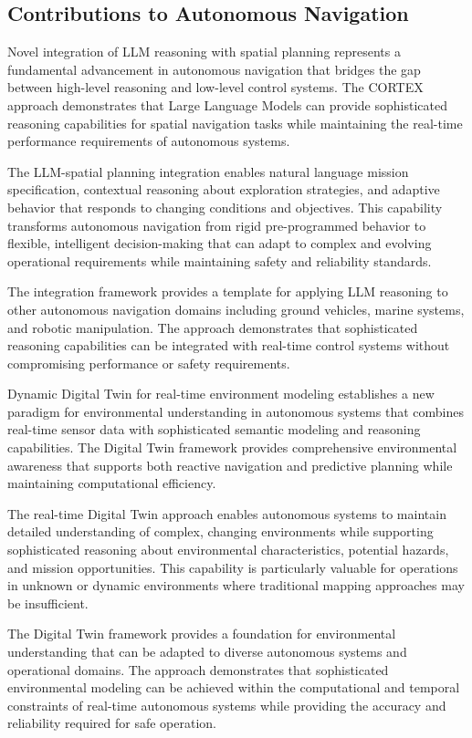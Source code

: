 \subsection{Contributions to Autonomous Navigation}

Novel integration of LLM reasoning with spatial planning represents a fundamental advancement in autonomous navigation that bridges the gap between high-level reasoning and low-level control systems. The CORTEX approach demonstrates that Large Language Models can provide sophisticated reasoning capabilities for spatial navigation tasks while maintaining the real-time performance requirements of autonomous systems.

The LLM-spatial planning integration enables natural language mission specification, contextual reasoning about exploration strategies, and adaptive behavior that responds to changing conditions and objectives. This capability transforms autonomous navigation from rigid pre-programmed behavior to flexible, intelligent decision-making that can adapt to complex and evolving operational requirements while maintaining safety and reliability standards.

The integration framework provides a template for applying LLM reasoning to other autonomous navigation domains including ground vehicles, marine systems, and robotic manipulation. The approach demonstrates that sophisticated reasoning capabilities can be integrated with real-time control systems without compromising performance or safety requirements.

Dynamic Digital Twin for real-time environment modeling establishes a new paradigm for environmental understanding in autonomous systems that combines real-time sensor data with sophisticated semantic modeling and reasoning capabilities. The Digital Twin framework provides comprehensive environmental awareness that supports both reactive navigation and predictive planning while maintaining computational efficiency.

The real-time Digital Twin approach enables autonomous systems to maintain detailed understanding of complex, changing environments while supporting sophisticated reasoning about environmental characteristics, potential hazards, and mission opportunities. This capability is particularly valuable for operations in unknown or dynamic environments where traditional mapping approaches may be insufficient.

The Digital Twin framework provides a foundation for environmental understanding that can be adapted to diverse autonomous systems and operational domains. The approach demonstrates that sophisticated environmental modeling can be achieved within the computational and temporal constraints of real-time autonomous systems while providing the accuracy and reliability required for safe operation.


